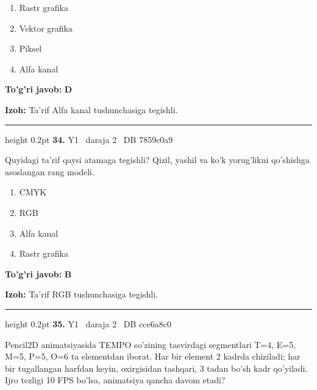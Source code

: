 \documentclass[10pt,a4paper,oneside]{article}
\begin{document}
\begin{enumerate}[label=\Alph*),leftmargin=9mm]
\item Rastr grafika
\item Vektor grafika
\item Piksel
\item Alfa kanal
\end{enumerate}
\begin{tcolorbox}[enhanced,breakable,colback=teal!4,colframe=teal!45!black,boxrule=0.45pt,arc=1.2mm,left=2.8mm,right=2.8mm,top=2mm,bottom=2mm,before skip=2mm,after skip=2mm]
\textbf{\color{teal}To'g'ri javob:} \textbf{D}
\par\smallskip
\textbf{Izoh:} Ta'rif Alfa kanal tushunchasiga tegishli.
\end{tcolorbox}
\vspace{2mm}\hrule height 0.2pt \vspace{4mm}
\hypertarget{q34}{\textbf{\color{ink}34.}}  {\color{muted}\scriptsize Y1 \textbullet\ daraja 2 \textbullet\ DB 7859c0a9}
\par
Quyidagi ta'rif qaysi atamaga tegishli? Qizil, yashil va ko'k yorug'likni qo'shishga asoslangan rang modeli.
\begin{enumerate}[label=\Alph*),leftmargin=9mm]
\item CMYK
\item RGB
\item Alfa kanal
\item Rastr grafika
\end{enumerate}
\begin{tcolorbox}[enhanced,breakable,colback=teal!4,colframe=teal!45!black,boxrule=0.45pt,arc=1.2mm,left=2.8mm,right=2.8mm,top=2mm,bottom=2mm,before skip=2mm,after skip=2mm]
\textbf{\color{teal}To'g'ri javob:} \textbf{B}
\par\smallskip
\textbf{Izoh:} Ta'rif RGB tushunchasiga tegishli.
\end{tcolorbox}
\vspace{2mm}\hrule height 0.2pt \vspace{4mm}
\hypertarget{q35}{\textbf{\color{ink}35.}}  {\color{muted}\scriptsize Y1 \textbullet\ daraja 2 \textbullet\ DB cce6a8c0}
\par
Pencil2D animatsiyasida TEMPO so'zining tasvirdagi segmentlari T=4, E=5, M=5, P=5, O=6 ta elementdan iborat. Har bir element 2 kadrda chiziladi; har bir tugallangan harfdan keyin, oxirgisidan tashqari, 3 tadan bo'sh kadr qo'yiladi. Ijro tezligi 10 FPS bo'lsa, animatsiya qancha davom etadi?
\end{document}
